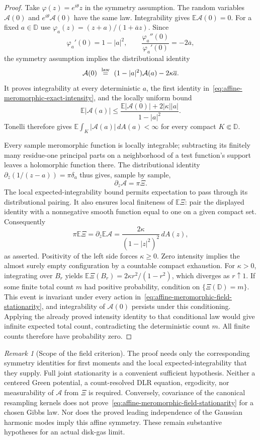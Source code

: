 \documentclass[11pt,a4paper]{article}
\numberwithin{equation}{section}
\theoremstyle{definition}
\theoremstyle{remark}
\newtheorem{remark}[theorem]{Remark}
\newcommand{\D}{\mathbb D}
\newcommand{\E}{\mathbb E}
\begin{document}
\begin{proof}
Take $\varphi(z)=e^{i\theta}z$ in the symmetry assumption.
The random variables $\mathcal A(0)$ and
$e^{i\theta}\mathcal A(0)$ have the same law. Integrability gives
$\E\mathcal A(0)=0$. For a fixed $a\in\D$ use
$\varphi_a(z)=(z+a)/(1+\overline a z)$. Since
\[
 \varphi_a'(0)=1-|a|^2,\qquad
 \frac{\varphi_a''(0)}{\varphi_a'(0)}=-2\overline a,
\]
the symmetry assumption implies the distributional identity
\[
 \mathcal A(0)\ \stackrel{\rm law}=\
 (1-|a|^2)\mathcal A(a)-2\kappa\overline a.
\]
It proves integrability at every deterministic $a$, the first
identity in~\eqref{eq:affine-meromorphic-exact-intensity}, and the
locally uniform bound
\[
 \E|\mathcal A(a)|
 \le\frac{\E|\mathcal A(0)|+2|\kappa||a|}{1-|a|^2}.
\]
Tonelli therefore gives
$\E\int_K|\mathcal A(a)|\,dA(a)<\infty$ for every compact
$K\Subset\D$.

Every sample meromorphic function is locally integrable; subtracting
its finitely many residue-one principal parts on a neighborhood of
a test function's support leaves a holomorphic function there. The
distributional identity $\partial_{\overline z}(1/(z-a))=\pi\delta_a$
thus gives, sample by sample,
\[
 \partial_{\overline z}\mathcal A=\pi\Xi.
\]
The local expected-integrability bound permits expectation to pass
through its distributional pairing. It also ensures local finiteness
of $\E\Xi$: pair the displayed identity with a nonnegative smooth
function equal to one on a given compact set. Consequently
\[
 \pi\E\Xi
 =\partial_{\overline z}\E\mathcal A
 =\frac{2\kappa}{(1-|z|^2)^2}\,dA(z),
\]
as asserted. Positivity of the left side forces $\kappa\ge0$.
Zero intensity implies the almost surely empty configuration by a
countable compact exhaustion. For $\kappa>0$, integrating over
$B_r$ yields
$\E\Xi(B_r)=2\kappa r^2/(1-r^2)$, which diverges as $r\uparrow1$.
If some finite total count $m$ had positive probability, condition
on $\{\Xi(\D)=m\}$. This event is invariant under every action
in~\eqref{eq:affine-meromorphic-field-stationarity}, and integrability
of $\mathcal A(0)$ persists under this conditioning. Applying the
already proved intensity identity to that conditional law would
give infinite expected total count, contradicting the deterministic
count $m$. All finite counts therefore have probability zero.
\end{proof}

\begin{remark}[Scope of the field criterion]
The proof needs only the corresponding symmetry identities for first
moments and the local expected-integrability that they supply. Full
joint stationarity is a convenient sufficient hypothesis. Neither a
centered Green potential, a count-resolved DLR equation, ergodicity,
nor measurability of $\mathcal A$ from $\Xi$ is required.
Conversely, covariance of the canonical resampling kernels does not
prove~\eqref{eq:affine-meromorphic-field-stationarity} for a chosen
Gibbs law. Nor does the proved leading independence of the Gaussian
harmonic modes imply this affine symmetry. These remain substantive
hypotheses for an actual disk-gas limit.
\end{remark}
\end{document}
